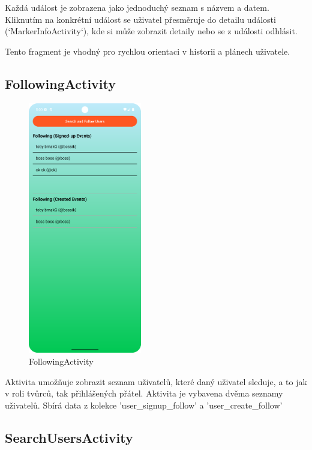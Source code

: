 Každá událost je zobrazena jako jednoduchý seznam s názvem a datem. Kliknutím na konkrétní událost se uživatel přesměruje do detailu události (`MarkerInfoActivity`), kde si může zobrazit detaily nebo se z události odhlásit.

Tento fragment je vhodný pro rychlou orientaci v historii a plánech uživatele.
\cite{FirebaseFirestoreFilter} 







\subsection*{FollowingActivity}

\begin{figure}[H]
    \centering
    \includegraphics[height=11cm]{Images/Following_activity.png}
    \caption{FollowingActivity}
    \label{fig:Update-account}
\end{figure}

Aktivita umožňuje zobrazit seznam uživatelů, které daný uživatel sleduje, a to jak v roli tvůrců, tak přihlášených přátel. Aktivita je vybavena dvěma seznamy uživatelů. Sbírá data z kolekce 'user\_signup\_follow' a 'user\_create\_follow'







\subsection*{SearchUsersActivity}

